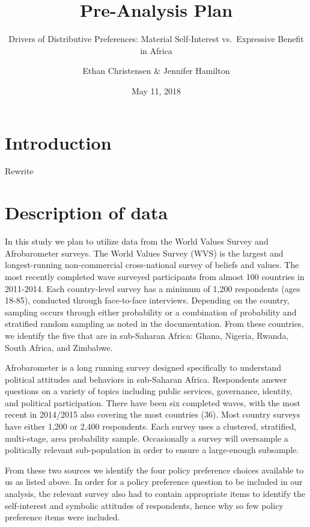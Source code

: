 \documentclass[]{article}
\title{Pre-Analysis Plan}
\subtitle{Drivers of Distributive Preferences: Material Self-Interest
vs.~Expressive Benefit in Africa}
\author{Ethan Christensen \& Jennifer Hamilton}
\date{May 11, 2018}
\begin{document}
\maketitle

\section{Introduction}\label{introduction}

Rewrite

\section{Description of data}\label{description-of-data}

In this study we plan to utilize data from the World Values Survey and
Afrobarometer surveys. The World Values Survey (WVS) is the largest and
longest-running non-commercial cross-national survey of beliefs and
values. The most recently completed wave surveyed participants from
almost 100 countries in 2011-2014. Each country-level survey has a
minimum of 1,200 respondents (ages 18-85), conducted through
face-to-face interviews. Depending on the country, sampling occurs
through either probability or a combination of probability and
stratified random sampling as noted in the documentation. From these
countries, we identify the five that are in sub-Saharan Africa: Ghana,
Nigeria, Rwanda, South Africa, and Zimbabwe.

Afrobarometer is a long running survey designed specifically to
understand political attitudes and behaviors in sub-Saharan Africa.
Respondents answer questions on a variety of topics including public
services, governance, identity, and political participation. There have
been six completed waves, with the most recent in 2014/2015 also
covering the most countries (36). Most country surveys have either 1,200
or 2,400 respondents. Each survey uses a clustered, stratified,
multi-stage, area probability sample. Occasionally a survey will
oversample a politically relevant sub-population in order to ensure a
large-enough subsample.

From these two sources we identify the four policy preference choices
available to us as listed above. In order for a policy preference
question to be included in our analysis, the relevant survey also had to
contain appropriate items to identify the self-interest and symbolic
attitudes of respondents, hence why so few policy preference items were
included.
\end{document}
